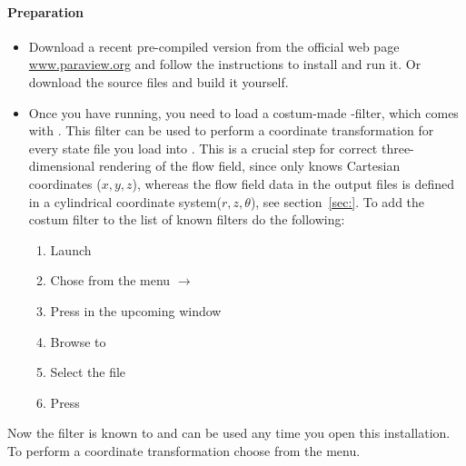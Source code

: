 \documentclass[a4paper, 11pt, DIV=11]{scrartcl}
\begin{document}
\paragraph{Preparation}
\begin{itemize}
\item
Download a recent pre-compiled version from the official web page
\url{www.paraview.org} and follow the instructions to install and
run it. Or download the source files and build it yourself.
\item
Once you have  running, you need to load a  costum-made
-filter, which comes with \nsc. This filter can be used to
perform a coordinate transformation for every state file you load into
. This is a crucial step for correct three-dimensional
rendering of the flow field, since  only knows Cartesian
coordinates ($x, y, z$), whereas the flow field data in the 
output files is defined in a cylindrical coordinate system($r, z, \theta$),
see section~\ref{sec:}. To add the  costum filter to the list of known filters
do the following:
\begin{enumerate}
\item Launch \paraview
\item Chose from the menu  $\to$ 
\item Press  in the upcoming window
\item Browse to 
\item Select the file 
\item Press 
\end{enumerate}
\end{itemize}
Now the filter is known to \paraview and can be used any time you
open this installation. To perform a coordinate transformation choose
from the menu.
\end{document}
